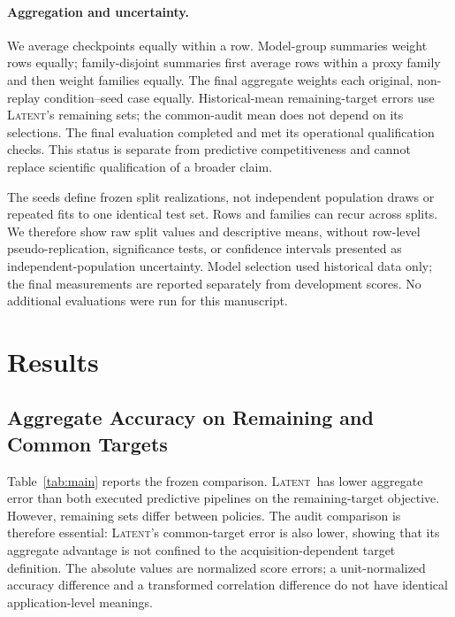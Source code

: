 \documentclass{article}
\newcommand{\latent}{\textsc{Latent}}
\begin{document}
\paragraph{Aggregation and uncertainty.}
We average checkpoints equally within a row. Model-group summaries weight rows equally; family-disjoint summaries first average rows within a proxy family and then weight families equally. The final aggregate weights each original, non-replay condition--seed case equally. Historical-mean remaining-target errors use \latent's remaining sets; the common-audit mean does not depend on its selections. The final evaluation completed and met its operational qualification checks. This status is separate from predictive competitiveness and cannot replace scientific qualification of a broader claim.

The seeds define frozen split realizations, not independent population draws or repeated fits to one identical test set. Rows and families can recur across splits. We therefore show raw split values and descriptive means, without row-level pseudo-replication, significance tests, or confidence intervals presented as independent-population uncertainty. Model selection used historical data only; the final measurements are reported separately from development scores. No additional evaluations were run for this manuscript.

\section{Results}
\subsection{Aggregate Accuracy on Remaining and Common Targets}
Table~\ref{tab:main} reports the frozen comparison. \latent\ has lower aggregate error than both executed predictive pipelines on the remaining-target objective. However, remaining sets differ between policies. The audit comparison is therefore essential: \latent's common-target error is also lower, showing that its aggregate advantage is not confined to the acquisition-dependent target definition. The absolute values are normalized score errors; a unit-normalized accuracy difference and a transformed correlation difference do not have identical application-level meanings.
\end{document}

